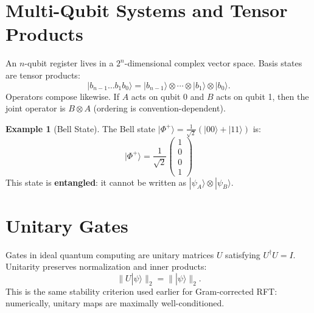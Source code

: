 \documentclass[11pt, a4paper, openany]{book}
\theoremstyle{definition}
\newtheorem{example}{Example}[chapter]
\begin{document}
\section{Multi-Qubit Systems and Tensor Products}
An $n$-qubit register lives in a $2^n$-dimensional complex vector space. Basis states are tensor products:
\begin{equation}
|b_{n-1}\dots b_1 b_0\rangle = |b_{n-1}\rangle \otimes \cdots \otimes |b_1\rangle \otimes |b_0\rangle.
\end{equation}
Operators compose likewise. If $A$ acts on qubit 0 and $B$ acts on qubit 1, then the joint operator is $B\otimes A$ (ordering is convention-dependent).

\begin{example}[Bell State]
The Bell state $|\Phi^+\rangle = \frac{1}{\sqrt{2}}(|00\rangle + |11\rangle)$ is:
\begin{equation}
|\Phi^+\rangle = \frac{1}{\sqrt{2}}\begin{pmatrix} 1 \\ 0 \\ 0 \\ 1 \end{pmatrix}
\end{equation}
This state is \textbf{entangled}: it cannot be written as $|\psi_A\rangle \otimes |\psi_B\rangle$.
\end{example}

\section{Unitary Gates}
Gates in ideal quantum computing are unitary matrices $U$ satisfying $U^\dagger U = I$. Unitarity preserves normalization and inner products:
\begin{equation}
\|U|\psi\rangle\|_2 = \||\psi\rangle\|_2.
\end{equation}
This is the same stability criterion used earlier for Gram-corrected RFT: numerically, unitary maps are maximally well-conditioned.
\end{document}
